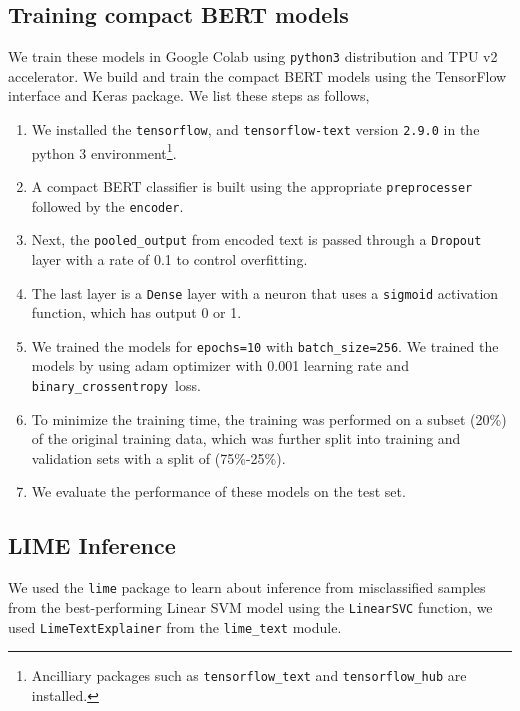 \documentclass[11pt]{article}
\begin{document}
\subsection{Training compact BERT models}
We train these models in Google Colab using \texttt{python3} distribution and TPU v2 accelerator. We build and train the compact BERT models using the TensorFlow interface \cite{tensorflow}and Keras \cite{keras} package. We list these steps as follows,
\begin{enumerate}
    \item We installed the \texttt{tensorflow}, and \texttt{tensorflow-text} version \texttt{2.9.0} in the python 3 environment\footnote{Ancilliary packages such as \texttt{tensorflow\_text} and \texttt{tensorflow\_hub} are installed.}.
    \item A compact BERT classifier is built using the appropriate \texttt{preprocesser} followed by the \texttt{encoder}.

    \item Next, the \texttt{pooled\_output} from encoded text is passed through a \texttt{Dropout} layer with a rate of 0.1 to control overfitting.
    \item The last layer is a \texttt{Dense} layer with a neuron that uses a \texttt{sigmoid} activation function, which has output 0 or 1.

 \item We trained the models for \texttt{epochs=10} with \texttt{batch\_size=256}. We trained the models by using adam optimizer \cite{adam} with 0.001 learning rate and \texttt{binary\_crossentropy }loss.
 \item  To minimize the training time, the training was performed on a subset (20\%) of the original training data, which was further split into training and validation sets with a split of (75\%-25\%). 

    \item We evaluate the performance of these models on the test set.

\end{enumerate}

\subsection{LIME Inference}
 We used the \texttt{lime} package to learn about inference from misclassified samples from the best-performing Linear SVM model using the \texttt{LinearSVC} function, we used \texttt{LimeTextExplainer} from the \texttt{lime\_text} module.
 
\end{document}

